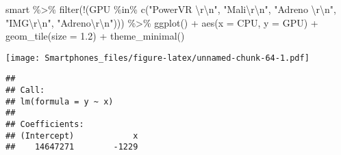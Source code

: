 \documentclass[
]{article}
\newenvironment{Shaded}{\begin{snugshade}}{\end{snugshade}}
\newcommand{\AttributeTok}[1]{\textcolor[rgb]{0.77,0.63,0.00}{#1}}
\newcommand{\CommentTok}[1]{\textcolor[rgb]{0.56,0.35,0.01}{\textit{#1}}}
\newcommand{\FloatTok}[1]{\textcolor[rgb]{0.00,0.00,0.81}{#1}}
\newcommand{\FunctionTok}[1]{\textcolor[rgb]{0.00,0.00,0.00}{#1}}
\newcommand{\NormalTok}[1]{#1}
\newcommand{\OtherTok}[1]{\textcolor[rgb]{0.56,0.35,0.01}{#1}}
\newcommand{\SpecialCharTok}[1]{\textcolor[rgb]{0.00,0.00,0.00}{#1}}
\newcommand{\StringTok}[1]{\textcolor[rgb]{0.31,0.60,0.02}{#1}}
\begin{document}
\begin{Shaded}
\begin{Highlighting}[]
\NormalTok{smart }\SpecialCharTok{\%\textgreater{}\%}
 \FunctionTok{filter}\NormalTok{(}\SpecialCharTok{!}\NormalTok{(GPU }\SpecialCharTok{\%in\%} \FunctionTok{c}\NormalTok{(}\StringTok{"PowerVR }\SpecialCharTok{\textbackslash{}r\textbackslash{}n}\StringTok{"}\NormalTok{, }\StringTok{"Mali}\SpecialCharTok{\textbackslash{}r\textbackslash{}n}\StringTok{"}\NormalTok{, }\StringTok{"Adreno }\SpecialCharTok{\textbackslash{}r\textbackslash{}n}\StringTok{"}\NormalTok{, }\StringTok{"IMG}\SpecialCharTok{\textbackslash{}r\textbackslash{}n}\StringTok{"}\NormalTok{, }\StringTok{"Adreno}\SpecialCharTok{\textbackslash{}r\textbackslash{}n}\StringTok{"}\NormalTok{))) }\SpecialCharTok{\%\textgreater{}\%}
 \FunctionTok{ggplot}\NormalTok{() }\SpecialCharTok{+}
  \FunctionTok{aes}\NormalTok{(}\AttributeTok{x =}\NormalTok{ CPU, }\AttributeTok{y =}\NormalTok{ GPU) }\SpecialCharTok{+}
  \FunctionTok{geom\_tile}\NormalTok{(}\AttributeTok{size =} \FloatTok{1.2}\NormalTok{) }\SpecialCharTok{+}
  \FunctionTok{theme\_minimal}\NormalTok{()}
\end{Highlighting}
\end{Shaded}

\texttt{[image: Smartphones\_files/figure-latex/unnamed-chunk-64-1.pdf]}

\begin{Shaded}
\end{Shaded}

\begin{verbatim}
## 
## Call:
## lm(formula = y ~ x)
## 
## Coefficients:
## (Intercept)            x  
##    14647271        -1229
\end{verbatim}

\begin{Shaded}
\end{Shaded}
\end{document}
